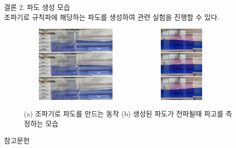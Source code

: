 \documentclass[Junlampaper, portrait]{Julam_PosterK}
\begin{document}
\begin{poster}
\begin{posterbox}[name=result,column=3,]{결론  }
\small {2. 파도 생성 모습\\}
    \scriptsize{조파기로 규칙파에 해당하는 파도를 생성하여 관련 실험을 진행할 수 있다. }
\begin{figure}[H]
            \includegraphics[trim=0 0 0 0, clip, width=0.49\textwidth, 
                height=3.8cm,
                ]
                {images/vlcsnap-2023-06-29-10h35m08s932-1.png} 
            \includegraphics[trim=0 0 0 0, clip, width=0.49\textwidth, 
                height=3.8cm,
                ]
                {images/vlcsnap-2023-06-29-10h53m08s226-1.png} 
        \caption{(a) 조파기로 파도를 만드는 동작 (b) 생성된 파도가 전파될때 파고를 측정하는 모습}
        \label{result}   
    \end{figure}    
\end{posterbox}

\begin{posterbox}[name=refs,column=3,below=result]{참고문헌}
\tiny


\end{posterbox}

\end{poster}
\end{document}
